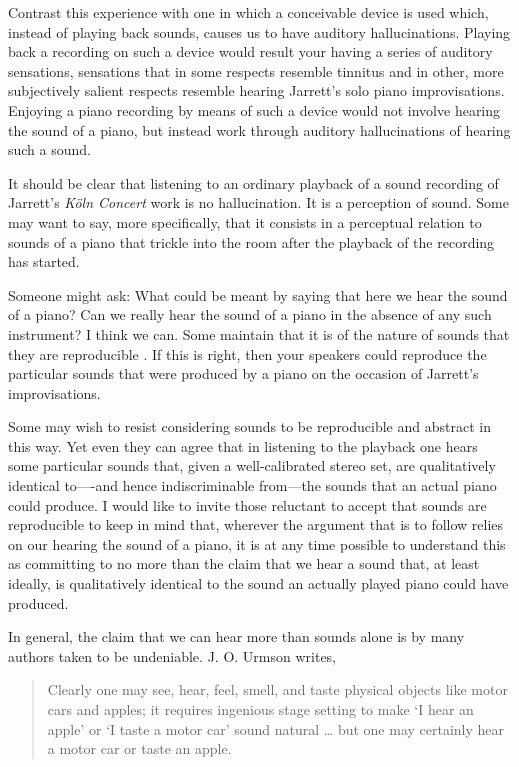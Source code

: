\documentclass[sloppy, journal, git, bytitle, dodraft]{humapap}
\begin{document}
Contrast this experience with one in which a conceivable device is used
which, instead of playing back sounds, causes us to have auditory
hallucinations. Playing back a recording on such a device would result
your having a series of auditory sensations, sensations that in some
respects resemble tinnitus and in other, more subjectively salient
respects resemble hearing Jarrett's solo piano improvisations. Enjoying
a piano recording by means of such a device would not involve hearing
the sound of a piano, but instead work through auditory hallucinations
of hearing such a sound.

It should be clear that listening to an ordinary playback of a sound
recording of Jarrett's \emph{Köln Concert} work is no hallucination. It
is a perception of sound. Some may want to say, more specifically, that
it consists in a perceptual relation to sounds of a piano that trickle
into the room after the playback of the recording has started.

Someone might ask: What could be meant by saying that here we hear the
sound of a piano? Can we really hear the sound of a piano in the absence
of any such instrument? I think we can. Some maintain that it is of the
nature of sounds that they are reproducible \autocite{martin2012aa}. If
this is right, then your speakers could reproduce the particular sounds
that were produced by a piano on the occasion of Jarrett's
improvisations.

Some may wish to resist considering sounds to be reproducible and
abstract in this way. Yet even they can agree that in listening to the
playback one hears some particular sounds that, given a well-calibrated
stereo set, are qualitatively identical to----and hence indiscriminable
from---the sounds that an actual piano could produce. I would like to
invite those reluctant to accept that sounds are reproducible to keep in
mind that, wherever the argument that is to follow relies on our hearing
the sound of a piano, it is at any time possible to understand this as
committing to no more than the claim that we hear a sound that, at least
ideally, is qualitatively identical to the sound an actually played
piano could have produced.



\sect In general, the claim that we can hear more than sounds alone is by many
authors taken to be undeniable. J. O. Urmson writes,

\begin{quote}
Clearly one may see, hear, feel, smell, and taste physical objects like
motor cars and apples; it requires ingenious stage setting to make `I
hear an apple' or `I taste a motor car' sound natural \ldots{} but one
may certainly hear a motor car or taste an
apple.\autocite[p. 117]{urmson1968aa}
\end{quote}
\end{document}

